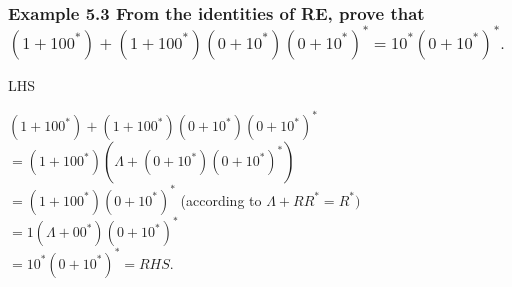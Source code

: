 \begin{frame}		
			\frametitle{Example 5.3 
			\textnormal{\small {From the identities of RE, prove that}}\\

\small$(1 + 100^*) + (1 + 100^*)(0 + 10^*)(0 + 10^*)^* = 10^*(0 +10^*)^*.$
		}	
\!\!\!\!\!\!\!\!\!\!\!\!\!\!\!\!\!\!\!\!\begin{solution}{LHS}
\end{solution}
\begin{listing} 
\begin{center}
                        $(1 + 100^*) + (1 + 100^*)(0 + 10^*)(0 + 10^*)^*$\\
\!\!\!\!\!\!\!\!\!\!\!$= (1 + 100^*) (\Lambda + (0 + 10^*)(0 + 10^*)^*)$\\
\qquad\qquad\;$= (1 + 100^*)(0 + 10^*)^*$ (according to $\Lambda + RR^* = R^*)$\\
\hspace{-33mm} $=1(\Lambda + 00^*)(0 + 10^*)^*$\\
\hspace{-33mm} $= 10^*(0 + 10^*)^* = RHS.$
\end{center}
\end{listing}
	\end{frame}	
